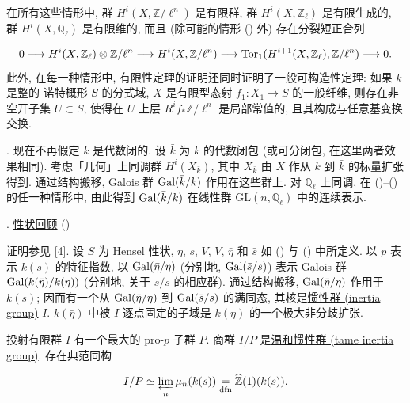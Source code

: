 在所有这些情形中, 群 $H^i(X,\mathbb{Z}/\ell^n)$ 是有限群, 群 $H^i(X,\mathbb{Z}_\ell)$ 是有限生成的, 群 $H^i(X,\mathbb{Q}_\ell)$ 是有限维的, 而且 (除可能的情形 () 外) 存在分裂短正合列

\begin{equation*}
0 \longrightarrow H^i(X,\mathbb{Z}_\ell)\otimes \mathbb{Z}/\ell^n
\longrightarrow H^i(X,\mathbb{Z}/\ell^n)
\longrightarrow \operatorname{Tor}_1(H^{i+1}(X,\mathbb{Z}_\ell),\mathbb{Z}/\ell^n)
\longrightarrow 0.
\end{equation*}
此外, 在每一种情形中, 有限性定理的证明还同时证明了一般可构造性定理: 如果 $k$ 是整的 诺特概形 $S$ 的分式域, $X$ 是有限型态射 $f_1:X_1\longrightarrow S$ 的一般纤维, 则存在非空开子集 $U\subset S$, 使得在 $U$ 上层 $R^i f_*\mathbb{Z}/\ell^n$ 是局部常值的, 且其构成与任意基变换交换.

. 现在不再假定 $k$ 是代数闭的. 设 $\bar{k}$ 为 $k$ 的代数闭包 (或可分闭包, 在这里两者效果相同). 考虑「几何」上同调群 $H^i(X_{\bar{k}})$, 其中 $X_{\bar{k}}$ 由 $X$ 作从 $k$ 到 $\bar{k}$ 的标量扩张得到. 通过结构搬移, Galois 群 $\operatorname{Gal}(\bar{k}/k)$ 作用在这些群上. 对 $\mathbb{Q}_\ell$ 上同调, 在 ()--() 的任一种情形中, 由此得到 $\operatorname{Gal}(\bar{k}/k)$ 在线性群 $\mathrm{GL}(n,\mathbb{Q}_\ell)$ 中的连续表示.

. \underline{性状回顾} ()

证明参见 [4]. 设 $S$ 为 Hensel 性状, $\eta$, $s$, $V$, $\bar V$, $\bar\eta$ 和 $\bar s$ 如 () 与 () 中所定义. 以 $p$ 表示 $k(s)$ 的特征指数, 以 $\operatorname{Gal}(\bar\eta/\eta)$ (分别地, $\operatorname{Gal}(\bar s/s)$) 表示 Galois 群 $\operatorname{Gal}(k(\bar\eta)/k(\eta))$ (分别地, 关于 $\bar s/s$ 的相应群). 通过结构搬移, $\operatorname{Gal}(\bar\eta/\eta)$ 作用于 $k(\bar s)$; 因而有一个从 $\operatorname{Gal}(\bar\eta/\eta)$ 到 $\operatorname{Gal}(\bar s/s)$ 的满同态, 其核是\underline{惯性群 (inertia group)} $I$. $k(\bar\eta)$ 中被 $I$ 逐点固定的子域是 $k(\eta)$ 的一个极大非分歧扩张.

投射有限群 $I$ 有一个最大的 pro-$p$ 子群 $P$. 商群 $I/P$ 是\underline{温和惯性群 (tame inertia group)}. 存在典范同构

\begin{equation*}
I/P\simeq \varprojlim_n\mu_n(k(\bar s))
\underset{\mathrm{dfn}}{=}\widehat{\mathbb{Z}}(1)(k(\bar s)).
\end{equation*}

